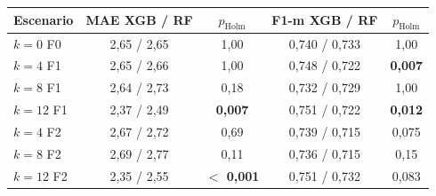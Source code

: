 \begin{tabular}{@{}lcccc@{}}
\toprule
Escenario & MAE XGB / RF & $p_{\text{Holm}}$ & F1-m XGB / RF & $p_{\text{Holm}}$ \\
\midrule
$k=0$ F0 & 2,65 / 2,65 & 1,00 & 0,740 / 0,733 & 1,00 \\
$k=4$ F1 & 2,65 / 2,66 & 1,00 & 0,748 / 0,722 & \textbf{0,007} \\
$k=8$ F1 & 2,64 / 2,73 & 0,18 & 0,732 / 0,729 & 1,00 \\
$k=12$ F1 & 2,37 / 2,49 & \textbf{0,007} & 0,751 / 0,722 & \textbf{0,012} \\
$k=4$ F2 & 2,67 / 2,72 & 0,69 & 0,739 / 0,715 & 0,075 \\
$k=8$ F2 & 2,69 / 2,77 & 0,11 & 0,736 / 0,715 & 0,15 \\
$k=12$ F2 & 2,35 / 2,55 & \textbf{$<$ 0,001} & 0,751 / 0,732 & 0,083 \\
\bottomrule
\end{tabular}
